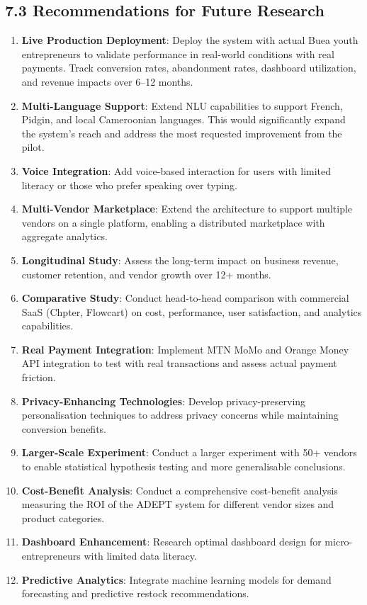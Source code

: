 \documentclass[12pt,a4paper]{article}
\begin{document}
\subsection{7.3 Recommendations for Future Research}

\begin{enumerate}
    \item \textbf{Live Production Deployment}: Deploy the system with actual Buea youth entrepreneurs to validate performance in real-world conditions with real payments. Track conversion rates, abandonment rates, dashboard utilization, and revenue impacts over 6--12 months.
    \item \textbf{Multi-Language Support}: Extend NLU capabilities to support French, Pidgin, and local Cameroonian languages. This would significantly expand the system's reach and address the most requested improvement from the pilot.
    \item \textbf{Voice Integration}: Add voice-based interaction for users with limited literacy or those who prefer speaking over typing.
    \item \textbf{Multi-Vendor Marketplace}: Extend the architecture to support multiple vendors on a single platform, enabling a distributed marketplace with aggregate analytics.
    \item \textbf{Longitudinal Study}: Assess the long-term impact on business revenue, customer retention, and vendor growth over 12+ months.
    \item \textbf{Comparative Study}: Conduct head-to-head comparison with commercial SaaS (Chpter, Flowcart) on cost, performance, user satisfaction, and analytics capabilities.
    \item \textbf{Real Payment Integration}: Implement MTN MoMo and Orange Money API integration to test with real transactions and assess actual payment friction.
    \item \textbf{Privacy-Enhancing Technologies}: Develop privacy-preserving personalisation techniques to address privacy concerns while maintaining conversion benefits.
    \item \textbf{Larger-Scale Experiment}: Conduct a larger experiment with 50+ vendors to enable statistical hypothesis testing and more generalisable conclusions.
    \item \textbf{Cost-Benefit Analysis}: Conduct a comprehensive cost-benefit analysis measuring the ROI of the ADEPT system for different vendor sizes and product categories.
    \item \textbf{Dashboard Enhancement}: Research optimal dashboard design for micro-entrepreneurs with limited data literacy.
    \item \textbf{Predictive Analytics}: Integrate machine learning models for demand forecasting and predictive restock recommendations.
\end{enumerate}
\end{document}
